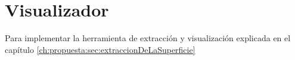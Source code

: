 \section{Visualizador}
\label{ch:implementacion:sec:visualizador}

Para implementar la herramienta de extracción y visualización explicada en el capítulo \ref{ch:propuesta:sec:extraccionDeLaSuperficie}
